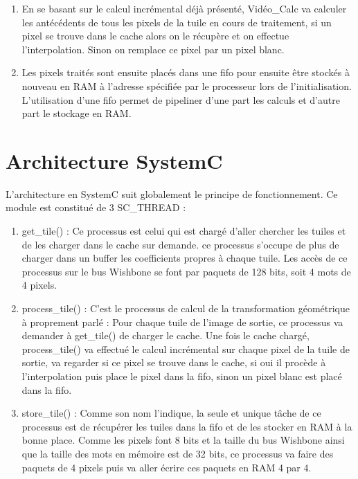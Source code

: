 \documentclass[a4paper,12pt]{report}
\begin{document}
{{\begin{enumerate}
		\item En se basant sur le calcul incrémental déjà présenté, Vidéo\_Calc va calculer les antécédents de tous les pixels de la tuile en cours de traitement, si un pixel se trouve dans le cache alors on le récupère et  on effectue l'interpolation. Sinon on remplace ce pixel par un pixel blanc.

		\item Les pixels traités sont ensuite placés dans une fifo pour ensuite être stockés à nouveau en RAM à l'adresse spécifiée par le processeur lors de l'initialisation. L'utilisation d'une fifo permet de pipeliner d'une part les calculs et d'autre part le stockage en RAM.

		\end{enumerate}

	 \section{Architecture SystemC}
	 L'architecture en SystemC suit globalement le principe de fonctionnement. Ce module est constitué de 3 SC\_THREAD :

		\begin{enumerate}

	 \item get\_tile() : Ce processus est celui qui est chargé d'aller chercher les tuiles et de les charger dans le cache sur demande. ce processus s'occupe de plus de charger dans un buffer les coefficients propres à chaque tuile. Les accès de ce processus sur le bus Wishbone se font par paquets de 128 bits, soit 4 mots de 4 pixels.


	\item process\_tile() : C'est le processus de calcul de la transformation géométrique à proprement parlé : Pour chaque tuile de l'image de sortie, ce processus va demander à get\_tile() de charger le cache. Une fois le cache chargé, process\_tile() va effectué le calcul incrémental sur chaque pixel de la tuile de sortie, va regarder si ce pixel se trouve dans le cache, si oui il procède à l'interpolation puis place le pixel dans la fifo, sinon un pixel blanc est placé dans la fifo.


	\item store\_tile() : Comme son nom l'indique, la seule et unique tâche de ce processus est de récupérer les tuiles dans la fifo et de les stocker en RAM à la bonne place. Comme les  pixels font 8 bits et la taille du bus Wishbone ainsi que la taille des mots en mémoire  est de 32 bits, ce processus va faire des paquets de 4 pixels puis va aller écrire ces paquets en RAM 4 par 4.
\end{enumerate}

}}
\end{document}
